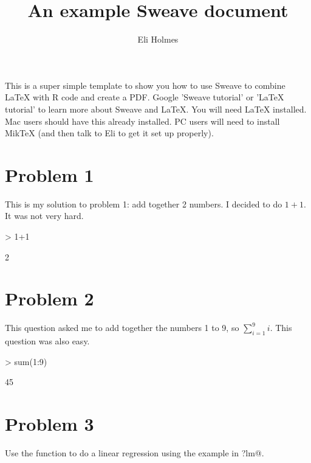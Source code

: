 \documentclass{article}
\begin{document}


\title{An example Sweave document}
\author{Eli Holmes}
\maketitle

This is a super simple template to show you how to use Sweave to combine LaTeX with R code and create a PDF. Google 'Sweave tutorial' or 'LaTeX tutorial' to learn more about Sweave and LaTeX.  You will need LaTeX installed.  Mac users should have this already installed.  PC users will need to install MikTeX (and then talk to Eli to get it set up properly).

\section*{Problem 1}

This is my solution to problem 1: add together 2 numbers. I decided to do $1+1$. It was not very hard. 
\begin{Schunk}
\begin{Sinput}
> 1+1
\end{Sinput}
\begin{Soutput}
[1] 2
\end{Soutput}
\end{Schunk}

\section*{Problem 2}

This question asked me to add together the numbers 1 to 9, so $\sum_{i=1}^9 i$. This question was also easy.

\begin{Schunk}
\begin{Sinput}
> sum(1:9)
\end{Sinput}
\begin{Soutput}
[1] 45
\end{Soutput}
\end{Schunk}

\section*{Problem 3}

Use the \verb@lm@ function to do a linear regression using the example in \verb@?lm@.
\end{document}
